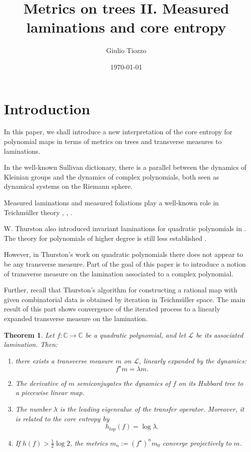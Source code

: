 \documentclass[11pt]{amsart}
\title{Metrics on trees II. Measured laminations and core entropy}
\author{Giulio Tiozzo}
\date{\today}
\newtheorem{theorem}{Theorem}[section]
\begin{document}
\maketitle





\section{Introduction}

In this paper, we shall introduce a new interpretation of the core entropy for polynomial maps in terms 
of metrics on trees and transverse measures to laminations. 

In the well-known Sullivan dictionary, there is a parallel between the dynamics of Kleinian groups 
and the dynamics of complex polynomials, both seen as dynamical systems on the Riemann sphere.

Measured laminations and measured foliations play a well-known role in Teichm\"uller theory \cite{Th-diffeo}, \cite{FLP}, \cite{Ha}. 

W. Thurston also introduced invariant laminations for quadratic polynomials in \cite{Th}. 
The theory for polynomials of higher degree is still less established \cite{people}. 

However, in Thurston's work on quadratic polynomials there does not appear to be any transverse measure. 
Part of the goal of this paper is to introduce a notion of transverse measure on the lamination associated to a 
complex polynomial.

Further, recall that Thurston's algorithm for constructing a rational map with given combinatorial data is 
obtained by iteration in Teichm\"uller space.
The main result of this part shows convergence of the iterated process to a linearly expanded 
transverse measure on the lamination. 

\begin{theorem}
Let $f : \mathbb{C} \to \mathbb{C}$ be a quadratic polynomial, and let $\mathcal{L}$ be its associated lamination. 
Then: 
\begin{enumerate}
\item
there exists a transverse measure $m$ on $\mathcal{L}$, linearly expanded by the dynamics: 
$$f^\star m = \lambda m.$$
\item 
The derivative of $m$ semiconjugates the dynamics of $f$ on its Hubbard tree to a piecewise linear map.
\item
The number $\lambda$ is the leading eigenvalue of the transfer operator. Moreover, it is related to the core entropy by 
$$h_{top}(f) = \log \lambda.$$
\item
If $h(f) > \frac{1}{2}\log 2$, the metrics $m_n := (f^\star)^n m_0$ converge projectively to $m$.
\end{enumerate}

\end{theorem}
\end{document}
